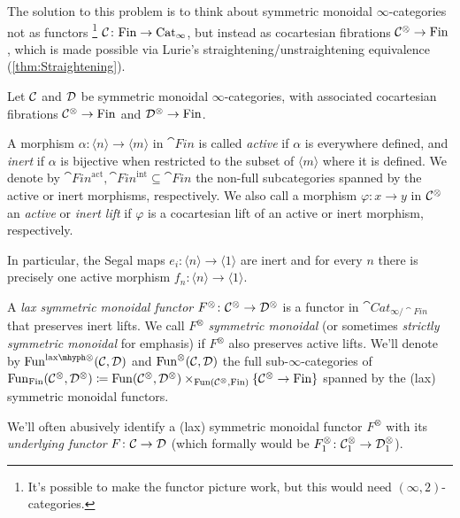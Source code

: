 The solution to this problem is to think about symmetric monoidal $\infty$-categories not as functors%
%
\footnote{It's possible to make the functor picture work, but this would need $(\infty,2)$-categories.}
$\mathcal{C}\colon \mathrm{Fin}\rightarrow \mathrm{Cat}_\infty$, but instead as cocartesian fibrations $\mathcal{C}^\otimes\rightarrow \mathrm{Fin}$, which is made possible via Lurie's straightening/unstraightening equivalence (\cref{thm:Straightening}).
\begin{defi}\label{def:LaxSymmetricMonoidal}
	Let $\mathcal{C}$ and $\mathcal{D}$ be symmetric monoidal $\infty$-categories, with associated cocartesian fibrations $\mathcal{C}^\otimes\rightarrow \mathrm{Fin}$ and $\mathcal{D}^\otimes\rightarrow \mathrm{Fin}$.
	\begin{alphanumerate}
		\item A morphism $\alpha\colon \langle n\rangle\rightarrow \langle m\rangle$ in $\cat{Fin}$ is called \emph{active} if $\alpha$ is everywhere defined, and \emph{inert} if $\alpha$ is bijective when restricted to the subset of $\langle m\rangle$ where it is defined. We denote by $\cat{Fin}^\mathrm{act},\cat{Fin}^\mathrm{int}\subseteq \cat{Fin}$ the non-full subcategories spanned by the active or inert morphisms, respectively. We also call a morphism $\varphi\colon x\rightarrow y$ in $\mathcal{C}^\otimes$ an \emph{active} or \emph{inert lift} if $\varphi$ is a cocartesian lift of an active or inert morphism, respectively.\label{enum:ActiveInert}
	\end{alphanumerate}
	In particular, the Segal maps $e_i\colon \langle n\rangle \rightarrow \langle 1\rangle$ are inert and for every $n$ there is precisely one active morphism $f_n\colon \langle n\rangle \rightarrow \langle 1\rangle$.
	\begin{alphanumerate}[resume]
		\item A \emph{lax symmetric monoidal functor} $F^\otimes\colon \mathcal{C}^\otimes\rightarrow \mathcal{D}^\otimes$ is a functor in $\cat{Cat}_{\infty/\cat{Fin}}$ that preserves inert lifts. We call $F^\otimes$ \emph{symmetric monoidal} (or sometimes \emph{strictly symmetric monoidal} for emphasis) if $F^\otimes$ also preserves active lifts. We'll denote by $\Fun^{\lax}(\Cc,\Dd)$ and $\operatorname{Fun}^\otimes(\mathcal{C},\mathcal{D})$ the full sub-$\infty$-categories of $\operatorname{Fun}_{\mathrm{Fin}}(\mathcal{C}^\otimes,\mathcal{D}^\otimes)\coloneqq \operatorname{Fun}(\mathcal{C}^\otimes,\mathcal{D}^\otimes)\times_{\operatorname{Fun}(\mathcal{C}^\otimes,\mathrm{Fin})}\{\mathcal{C}^\otimes\rightarrow \mathrm{Fin}\}$ spanned by the (lax) symmetric monoidal functors.\label{enum:LaxSymmetricMonoidal}
	\end{alphanumerate}
	We'll often abusively identify a (lax) symmetric monoidal functor $F^\otimes$ with its \emph{underlying functor} $F\colon \mathcal{C}\rightarrow \mathcal{D}$ (which formally would be $F^\otimes_1\colon \mathcal{C}_1^\otimes\rightarrow \mathcal{D}_1^\otimes$). 
\end{defi}

